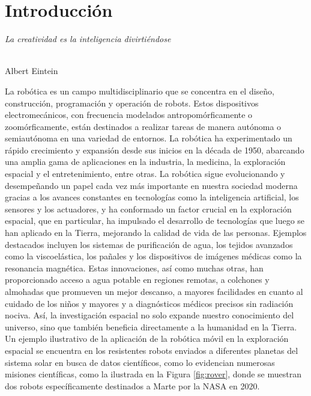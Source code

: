 \chapter{Introducción}
\label{cap:capitulo1}
\setcounter{page}{1}

\begin{flushright}
\begin{minipage}[]{10cm}
\emph{La creatividad es la inteligencia divirtiéndose}\\
\end{minipage}\\

Albert Eintein\\
\end{flushright}

\vspace{1cm}

La robótica es un campo multidisciplinario que se concentra en el diseño,
construcción, programación y operación de robots.
Estos dispositivos electromecánicos, con frecuencia modelados
antropomórficamente o zoomórficamente, están destinados a realizar tareas de
manera autónoma o semiautónoma en una variedad de entornos.
La robótica ha experimentado un rápido crecimiento y expansión desde sus inicios
en la década de 1950, abarcando una amplia gama de aplicaciones en la industria,
la medicina, la exploración espacial y el entretenimiento, entre otras.
La robótica sigue evolucionando y desempeñando un papel cada vez más importante
en nuestra sociedad moderna gracias a los avances constantes en tecnologías como
la inteligencia artificial, los sensores y los actuadores, y ha conformado un
factor crucial en la exploración espacial, que en particular, ha impulsado el
desarrollo de tecnologías que luego se han aplicado en la Tierra, mejorando la
calidad de vida de las personas.
Ejemplos destacados incluyen los sistemas de purificación de agua, los tejidos
avanzados como la viscoelástica, los pañales y los dispositivos de imágenes
médicas como la resonancia magnética.
Estas innovaciones, así como muchas otras, han proporcionado acceso a agua
potable en regiones remotas, a colchones y almohadas que promueven un mejor
descanso, a mayores facilidades en cuanto al cuidado de los niños y mayores y a
diagnósticos médicos precisos sin radiación nociva.
Así, la investigación espacial no solo expande nuestro conocimiento del
universo, sino que también beneficia directamente a la humanidad en la Tierra.
Un ejemplo ilustrativo de la aplicación de la robótica móvil en la exploración
espacial se encuentra en los resistentes robots enviados a diferentes planetas
del sistema solar en busca de datos científicos, como lo evidencian numerosas
misiones científicas, como la ilustrada en la Figura \ref{fig:rover}, donde
se muestran dos robots específicamente destinados a Marte por la NASA en 2020.

